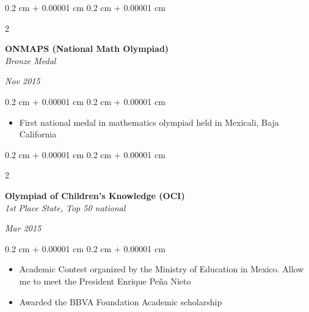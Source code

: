 \documentclass[10pt, letterpaper]{article}
\newenvironment{onecolentry}{
    \begin{adjustwidth}{
        0.2 cm + 0.00001 cm
    }{
        0.2 cm + 0.00001 cm
    }
}{
    \end{adjustwidth}
} %
\newenvironment{twocolentry}[2][]{
    \onecolentry
    \def\secondColumn{#2}
    \setcolumnwidth{\fill, 4.5 cm}
    \begin{paracol}{2}
}{
    \switchcolumn \raggedleft \secondColumn
    \end{paracol}
    \endonecolentry
} %
\begin{document}
    \vspace{0.2 cm}
    \begin{twocolentry}{
    \textit{Nov 2015}}
        \textbf{ONMAPS (National Math Olympiad)} \\
        \textit{Bronze Medal}
    \end{twocolentry}
    \begin{onecolentry}
        \begin{itemize}
            \item First national medal in mathematics olympiad held in Mexicali, Baja California
        \end{itemize}
    \end{onecolentry}
    
    \vspace{0.2 cm}
    \begin{twocolentry}{
    \textit{Mar 2015}}
        \textbf{Olympiad of Children's Knowledge (OCI)} \\
        \textit{1st Place State, Top 50 national}
    \end{twocolentry}
    \begin{onecolentry}
        \begin{itemize}
            \item Academic Contest organized by the Ministry of Education in Mexico. Allow me to meet the President Enrique Peña Nieto
            \item Awarded the BBVA Foundation Academic scholarship
        \end{itemize}
    \end{onecolentry}
\end{document}
